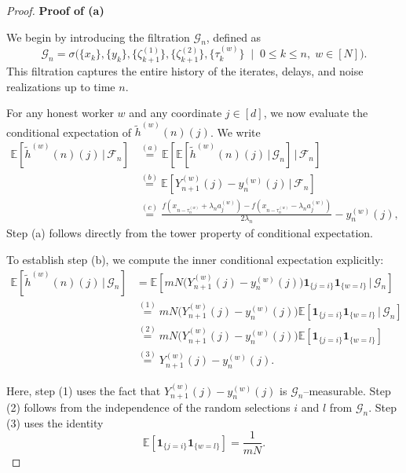 \documentclass{article}
\begin{document}
\begin{proof}

\textbf{Proof of (a)}

We begin by introducing the filtration $\mathcal{G}_n$, defined as
\[
\mathcal{G}_n 
= \sigma \Big( \{x_k\}, \{y_k\}, \{\zeta_{k+1}^{(1)}\}, \{\zeta_{k+1}^{(2)}\}, \{\tau_k^{(w)}\} \;\; \big| \;\; 0 \leq k \leq n,\; w \in [N] \Big).
\]
This filtration captures the entire history of the iterates, delays, and noise realizations up to time $n$.

For any honest worker $w$ and any coordinate $j \in [d]$, we now evaluate the conditional expectation of $\widetilde{h}^{(w)}(n)(j)$. We write
\begin{equation}
\begin{split}
\mathbb{E}\!\left[\widetilde{h}^{(w)}(n)(j) \,\big|\, \mathcal{F}_n \right]
&\overset{(a)}{=}
\mathbb{E}\!\left[
    \mathbb{E}\!\left[\widetilde{h}^{(w)}(n)(j)\,\big|\,\mathcal{G}_n\right]
    \,\big|\, \mathcal{F}_n
\right] \\
&\overset{(b)}{=}
\mathbb{E}\!\left[
    Y_{n+1}^{(w)}(j) - y_n^{(w)}(j)
    \,\big|\, \mathcal{F}_n
\right] \\
&\overset{(c)}{=}
\frac{f\!\left(x_{n-\tau_n^{(w)}} + \lambda_n a_j^{(w)}\right)
      - f\!\left(x_{n-\tau_n^{(w)}} - \lambda_n a_j^{(w)}\right)}
     {2\lambda_n}
- y_n^{(w)}(j),
\end{split}
\label{imt}
\end{equation}
Step (a) follows directly from the tower property of conditional expectation.

To establish step (b), we compute the inner conditional expectation explicitly:
\[
\begin{split}
\mathbb{E}\!\left[\widetilde{h}^{(w)}(n)(j)\,\big|\, \mathcal{G}_n\right]
&=
\mathbb{E}\!\left[
    mN \big(Y_{n+1}^{(w)}(j) - y_n^{(w)}(j)\big)
    \mathbf{1}_{\{j=i\}} \mathbf{1}_{\{w=l\}}
    \,\big|\, \mathcal{G}_n
\right] \\
&\overset{(1)}{=}
mN \big(Y_{n+1}^{(w)}(j) - y_n^{(w)}(j)\big)
\mathbb{E}\!\left[
    \mathbf{1}_{\{j=i\}} \mathbf{1}_{\{w=l\}}
    \,\big|\, \mathcal{G}_n
\right] \\
&\overset{(2)}{=}
mN \big(Y_{n+1}^{(w)}(j) - y_n^{(w)}(j)\big)
\mathbb{E}\!\left[
    \mathbf{1}_{\{j=i\}} \mathbf{1}_{\{w=l\}}
\right] \\
&\overset{(3)}{=}
Y_{n+1}^{(w)}(j) - y_n^{(w)}(j).
\end{split}
\]

Here, step (1) uses the fact that $Y_{n+1}^{(w)}(j) - y_n^{(w)}(j)$ is $\mathcal{G}_n$--measurable.  
Step (2) follows from the independence of the random selections $i$ and $l$ from $\mathcal{G}_n$.  
Step (3) uses the identity
\[
\mathbb{E}\!\left[\mathbf{1}_{\{j=i\}} \mathbf{1}_{\{w=l\}}\right]
= \frac{1}{mN}.
\]


\end{proof}
\end{document}
